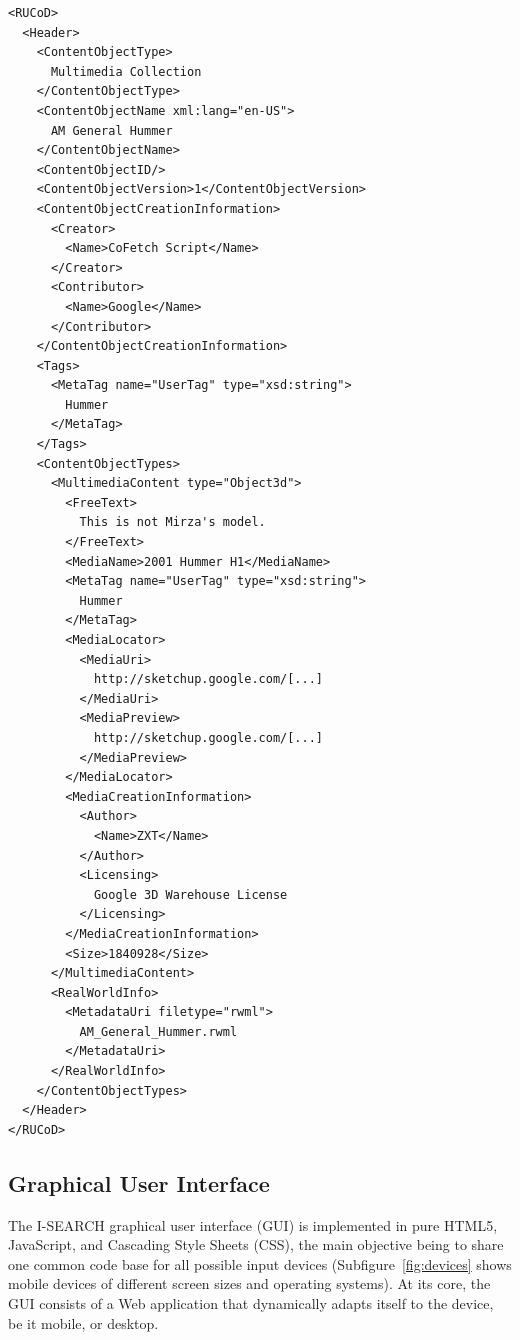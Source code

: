 \documentclass{acm_proc_article-sp}
\begin{document}
\begin{lstlisting}[caption=Sample RUCoD snippet (namespace declarations and some details removed for legibility reasons).,label={lst:rucod}]
<RUCoD>
  <Header>
    <ContentObjectType>
      Multimedia Collection
    </ContentObjectType>
    <ContentObjectName xml:lang="en-US">
      AM General Hummer
    </ContentObjectName>
    <ContentObjectID/>
    <ContentObjectVersion>1</ContentObjectVersion>
    <ContentObjectCreationInformation>
      <Creator>
        <Name>CoFetch Script</Name>
      </Creator>
      <Contributor>
        <Name>Google</Name>
      </Contributor>
    </ContentObjectCreationInformation>
    <Tags>
      <MetaTag name="UserTag" type="xsd:string">
        Hummer
      </MetaTag>
    </Tags>
    <ContentObjectTypes>
      <MultimediaContent type="Object3d">
        <FreeText>
          This is not Mirza's model.
        </FreeText>
        <MediaName>2001 Hummer H1</MediaName>
        <MetaTag name="UserTag" type="xsd:string">
          Hummer
        </MetaTag>
        <MediaLocator>
          <MediaUri>
            http://sketchup.google.com/[...]
          </MediaUri>
          <MediaPreview>
            http://sketchup.google.com/[...]
          </MediaPreview>
        </MediaLocator>
        <MediaCreationInformation>
          <Author>
            <Name>ZXT</Name>
          </Author>
          <Licensing>
            Google 3D Warehouse License
          </Licensing>
        </MediaCreationInformation>
        <Size>1840928</Size>
      </MultimediaContent>
      <RealWorldInfo>
        <MetadataUri filetype="rwml">
          AM_General_Hummer.rwml
        </MetadataUri>
      </RealWorldInfo>
    </ContentObjectTypes>
  </Header>
</RUCoD>
\end{lstlisting}

\subsection{Graphical User Interface}
The \mbox{I-SEARCH} graphical user interface (GUI) is implemented in pure HTML5, JavaScript, and Cascading Style Sheets (CSS), the main objective being to share one common code base for all possible input devices (Subfigure~\ref{fig:devices} shows mobile devices of different screen sizes and operating systems).
At its core, the GUI consists of a Web application that dynamically adapts itself to the device, be it mobile, or desktop.
\end{document}
